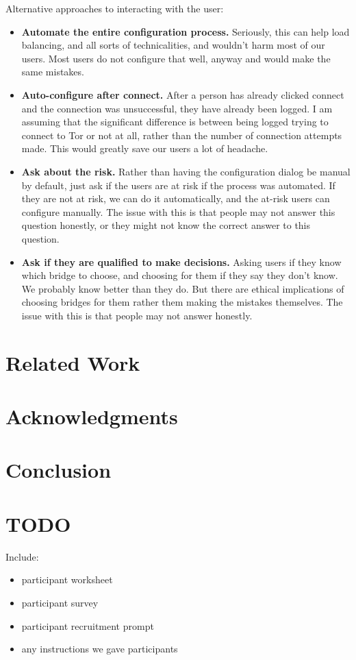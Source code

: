 \documentclass{template}
\begin{document}
Alternative approaches to interacting with the user: 
\begin{itemize} \itemsep1pt \parskip0pt  
\item{\bfseries Automate the entire configuration process.} Seriously, this can help load balancing, and all sorts of technicalities, and wouldn't harm most of our users. Most users do not configure that well, anyway and would make the same mistakes. 
\item {\bfseries Auto-configure after connect.} After a person has already clicked connect and the connection was unsuccessful, they have already been logged. I am assuming that the significant difference is between being logged trying to connect to Tor or not at all, rather than the number of connection attempts made. This would greatly save our users a lot of headache. 
\item{\bfseries Ask about the risk.} Rather than having the configuration dialog be manual by default, just ask if the users are at risk if the process was automated. If they are not at risk, we can do it automatically, and the at-risk users can configure manually. The issue with this is that people may not answer this question honestly, or they might not know the correct answer to this question. 
\item{\bfseries Ask if they are qualified to make decisions.} Asking users if they know which bridge to choose, and choosing for them if they say they don't know. We probably know better than they do. But there are ethical implications of choosing bridges for them rather them making the mistakes themselves. The issue with this is that people may not answer honestly. 
\end{itemize}


\section{Related Work} 

\section {Acknowledgments}


\section{Conclusion} 


 

\appendix
\section{TODO}
{\color {red} 
Include: 
\begin{itemize} \itemsep1pt \parskip0pt  
\item participant worksheet
\item participant survey
\item participant recruitment prompt
\item any instructions we gave participants
\end{itemize} 
}
\end{document}

